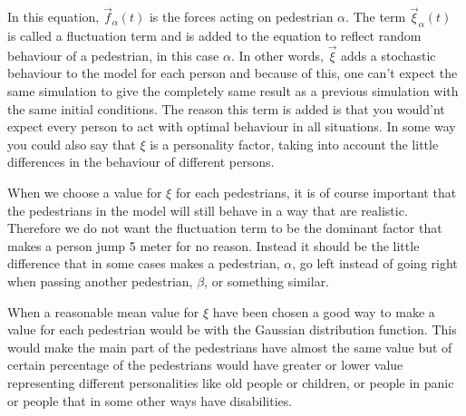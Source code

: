 In this equation, $\vec{f}_{\alpha}(t)$ is the forces acting on pedestrian $\alpha$. 
The term $\vec{\xi}_{\alpha}(t)$ is called a fluctuation term and is added to the equation 
to reflect random behaviour of a pedestrian, in this case $\alpha$. In other words, $\vec{\xi}$ 
adds a stochastic behaviour to the model for each person and because of this, one can't expect 
the same simulation to give the completely same result as a previous simulation with the same 
initial conditions. The reason this term is added is that you would'nt expect every person to 
act with optimal behaviour in all situations. In some way you could also say that $\xi$ is a 
personality factor, taking into account the little differences in the behaviour of different 
persons.

When we choose a value for $\xi$ for each pedestrians, it is of course important that the 
pedestrians in the model will still behave in a way that are realistic. Therefore we do not 
want the fluctuation term to be the dominant factor that makes a person jump 5 meter for no reason. 
Instead it should be the little difference that in some cases makes a pedestrian, $\alpha$, go left 
instead of going right when passing another pedestrian, $\beta$, or something similar.  

When a reasonable mean value for $\xi$ have been chosen a good way to make a value for each 
pedestrian would be with the Gaussian distribution function. This would make the main part of 
the pedestrians have almost the same value but of certain percentage of the pedestrians would 
have greater or lower value representing different personalities like old people or children, 
or people in panic or people that in some other ways have disabilities. 
